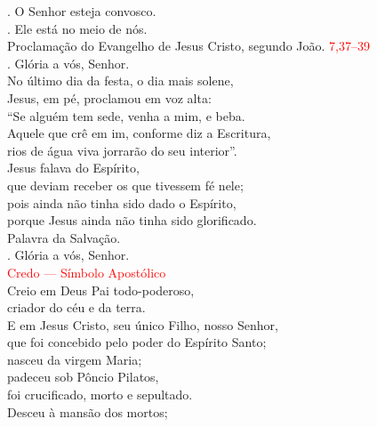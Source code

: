 \documentclass{book}
\begin{document}
\begin{flushleft}

    \vspace{0.2cm}
    {\color{red} \Vbar.} O Senhor esteja convosco. \\
    {\color{red} \Rbar.} Ele está no meio de nós.
    \vspace{0.1cm} \\
    {\color{red} \grecross} Proclamação do Evangelho de Jesus Cristo, segundo João.
    \hspace{\fill}
    \textcolor{red}{7,37--39} \\
    {\color{red} \Rbar.} Glória a vós, Senhor.
    \vspace{0.2cm} \\
    No último dia da festa, o dia mais solene, \\
    Jesus, em pé, proclamou em voz alta: \\
    ``Se alguém tem sede, venha a mim, e beba. \\
    Aquele que crê em im, conforme diz a Escritura, \\
    rios de água viva jorrarão do seu interior''. \\
    Jesus falava do Espírito, \\
    que deviam receber os que tivessem fé nele; \\
    pois ainda não tinha sido dado o Espírito, \\
    porque Jesus ainda não tinha sido glorificado.
    \vspace{0.1cm} \\
    Palavra da Salvação. \\
    {\color{red} \Rbar.} Glória a vós, Senhor.
    \vspace{0.2cm} \\
    \textcolor{red}{Credo --- Símbolo Apostólico}
    \vspace{0.2cm} \\
    Creio em Deus Pai todo-poderoso, \\
    criador do céu e da terra. \\
    E em Jesus Cristo, seu único Filho, nosso Senhor, \\
    que foi concebido pelo poder do Espírito Santo; \\
    nasceu da virgem Maria; \\
    padeceu sob Pôncio Pilatos, \\
    foi crucificado, morto e sepultado. \\
    Desceu à mansão dos mortos; \\

\end{flushleft}
\end{document}
